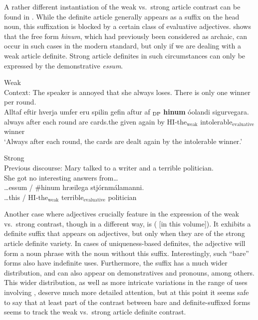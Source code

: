 \documentclass[output=paper
,modfonts
,nonflat]{langscibook}
\begin{document}
A rather different instantiation of the weak vs.\ strong article
contrast can be found in . While the definite article
generally appears as a suffix on the head noun, this suffixation is
blocked by a certain class of evaluative
adjectives. \citet{Ingason2016} shows that the free form
\textit{hinum}, which had previously been considered as archaic, can
occur in such cases in the modern standard, but only if we are dealing
with a weak article definite. Strong article definites in such
circumstances can only be expressed by the demonstrative \textit{\th
  essum}. 

\begin{exe}
\ex\label{ex:schwarz:20}   
\begin{xlist}
\ex Weak \\ Context: The speaker is annoyed that she always loses. There is
   only one winner per round. \\
\gll Alltaf eftir hverja {umfer\dh} {eru} spilin gefin aftur af {{\ob}$_\text{\textnormal{DP} }$\textbf{hinum}} {\'o\th olandi} {sigurvegara}{\cb}.  \\
 always after each  round are cards.the given again by {\db}{HI-{the}$_{\text{weak}}$} {intolerable$_{\text{evaluative}}$} winner \\
\glt `Always after each round, the cards are dealt again by the intolerable winner.'
   
\ex Strong\\ 
Previous discourse: Mary talked to a writer and a {terrible} politician.\\
  She got no interesting answers from\ldots \\
  \gll \ldots \th essum / \#{hinum} {hr\ae \dh ilega} stj\'ornm\'alamanni.\\
 \ldots this / \phantom{\#}HI-{the}$_\text{weak}$ terrible$_\text{evaluative}$ politician \\

\end{xlist}
\end{exe}

Another case where adjectives crucially feature in the expression
of the weak vs.\ strong contrast, though in a different way, is
 (\citealt{SereikaiteToAppear} {[}in this volume{]}). It exhibits a definite suffix that
appears on adjectives, but only when they are of the strong article
definite variety. In cases of uniqueness-based definites, the
adjective will form a noun phrase with the noun without this
suffix. Interestingly, such ``bare'' forms also have indefinite
uses. Furthermore, the suffix has a much wider distribution, and can
also appear on demonstratives and pronouns, among others. This wider
distribution, as well as more intricate variations in the range of
uses involving , deserve much more detailed attention,
but at this point it seems safe to say that at least part of the
contrast between bare and definite-suffixed forms seems to track the
weak vs.\ strong article definite contrast. 
\end{document}
